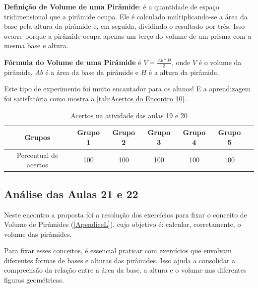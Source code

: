 \textbf{Definição de Volume de uma Pirâmide}: é a quantidade de espaço tridimensional que a pirâmide ocupa. Ele é calculado multiplicando-se a área da base pela altura da pirâmide e, em seguida, dividindo o resultado por três. Isso ocorre porque a pirâmide ocupa apenas um terço do volume de um prisma com a mesma base e altura.

\textbf{Fórmula do Volume de uma Pirâmide} é \textcolor[HTML]{0000FF}{$V = \frac{Ab *H}{3}$}, onde $V$ é o volume da pirâmide, $Ab$ é a área da base da pirâmide e $H$ é a altura da pirâmide.

Este tipo de experimento foi muito encantador para os alunos! E a aprendizagem foi satisfatória como mostra a \autoref{tab:Acertos do Encontro 10}.

\begin{table}[htbp] \centering
    \caption{Acertos na atividade das aulas 19 e 20} \label{tab:Acertos do Encontro 10}
    \begin{tabular}{|c|c|c|c|c|c|c|}
        \hline
        \textbf{Grupos}       & \textbf{Grupo 1} & \textbf{Grupo 2} & \textbf{Grupo 3} & \textbf{Grupo 4} & \textbf{Grupo 5} \\
        \hline
        Percentual de acertos & 100              & 100              & 100              & 100              & 100              \\
        \hline
    \end{tabular}
    \legend{\legendaTabela}
\end{table}

\subsection{Análise das Aulas 21 e 22}

Neste encontro a proposta foi a resolução dos exercícios para fixar o conceito de Volume de Pirâmides (\autoref{ApendiceL}), cujo objetivo é: calcular, corretamente, o volume das pirâmides.

Para fixar esses conceitos, é essencial praticar com exercícios que envolvam diferentes formas de bases e alturas das pirâmides. Isso ajuda a consolidar a compreensão da relação entre a área da base, a altura e o volume nas diferentes figuras geométricas.



